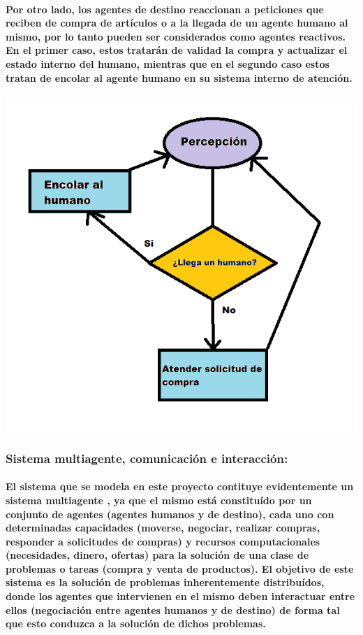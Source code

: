 \documentclass[12pt]{amsart}
\begin{document}
\paragraph{Por otro lado, los agentes de destino reaccionan a peticiones que reciben de compra de artículos o a la llegada de un agente humano al mismo, por lo tanto pueden ser considerados como agentes reactivos. En el primer caso, estos tratarán de validad la compra y actualizar el estado interno del humano, mientras que en el segundo caso estos tratan de encolar al agente humano en su sistema interno de atención.}

\begin{center}
	\includegraphics[scale=0.8]{./images/destalgo.png}
	\label{fig:destalgo}
\end{center}

\subsubsection{Sistema multiagente, comunicación e interacción:}

\paragraph{El sistema que se modela en este proyecto contituye evidentemente un sistema multiagente \cite{multiagent}, ya que el mismo está constituído por un conjunto de agentes (agentes humanos y de destino), cada uno con determinadas capacidades (moverse, negociar, realizar compras, responder a solicitudes de compras) y recursos computacionales (necesidades, dinero, ofertas) para la solución de una clase de problemas o tareas (compra y venta de productos). El objetivo de este sistema es la solución de problemas inherentemente distribuídos, donde los agentes que intervienen en el mismo deben interactuar entre ellos (negociación entre agentes humanos y de destino) de forma tal que esto conduzca a la solución de dichos problemas.}
\end{document}
